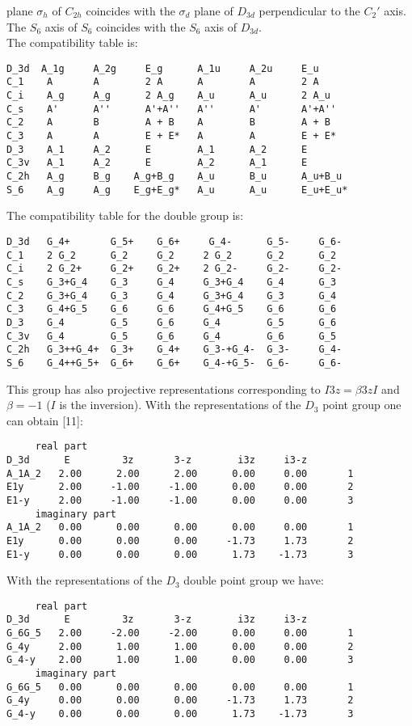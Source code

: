 \documentclass[12pt,a4paper]{article}
\begin{document}
plane $\sigma_h$ of $C_{2h}$ coincides with the $\sigma_d$ plane of $D_{3d}$
perpendicular to the $C_2'$ axis. The $S_6$ axis of $S_6$ coincides with the
$S_6$ axis of $D_{3d}$. \\
The compatibility table is:
\begin{verbatim}
D_3d  A_1g     A_2g     E_g      A_1u     A_2u     E_u
C_1    A       A        2 A      A        A        2 A
C_i    A_g     A_g      2 A_g    A_u      A_u      2 A_u
C_s    A'      A''      A'+A''   A''      A'       A'+A''
C_2    A       B        A + B    A        B        A + B
C_3    A       A        E + E*   A        A        E + E*
D_3    A_1     A_2      E        A_1      A_2      E
C_3v   A_1     A_2      E        A_2      A_1      E
C_2h   A_g     B_g    A_g+B_g    A_u      B_u      A_u+B_u   
S_6    A_g     A_g    E_g+E_g*   A_u      A_u      E_u+E_u*
\end{verbatim}
The compatibility table for the double group is:
\begin{verbatim}
D_3d   G_4+       G_5+    G_6+     G_4-      G_5-     G_6-
C_1    2 G_2      G_2     G_2     2 G_2      G_2      G_2      
C_i    2 G_2+     G_2+    G_2+    2 G_2-     G_2-     G_2-
C_s    G_3+G_4    G_3     G_4     G_3+G_4    G_4      G_3
C_2    G_3+G_4    G_3     G_4     G_3+G_4    G_3      G_4    
C_3    G_4+G_5    G_6     G_6     G_4+G_5    G_6      G_6
D_3    G_4        G_5     G_6     G_4        G_5      G_6
C_3v   G_4        G_5     G_6     G_4        G_6      G_5
C_2h   G_3++G_4+  G_3+    G_4+    G_3-+G_4-  G_3-     G_4-
S_6    G_4++G_5+  G_6+    G_6+    G_4-+G_5-  G_6-     G_6-
\end{verbatim}
This group has also projective representations corresponding to
$I {3z} = \beta {3z} I$ and $\beta=-1$ ($I$ is the inversion).
With the representations of the $D_3$ point group one can obtain [11]:
\begin{verbatim}
     real part
D_3d      E         3z       3-z        i3z     i3-z
A_1A_2   2.00      2.00      2.00      0.00     0.00       1
E1y      2.00     -1.00     -1.00      0.00     0.00       2
E1-y     2.00     -1.00     -1.00      0.00     0.00       3
     imaginary part
A_1A_2   0.00      0.00      0.00      0.00     0.00       1
E1y      0.00      0.00      0.00     -1.73     1.73       2
E1-y     0.00      0.00      0.00      1.73    -1.73       3
\end{verbatim}
With the representations of the $D_3$ double point group we have:
\begin{verbatim}
     real part
D_3d      E         3z       3-z        i3z     i3-z
G_6G_5   2.00     -2.00     -2.00      0.00     0.00       1
G_4y     2.00      1.00      1.00      0.00     0.00       2
G_4-y    2.00      1.00      1.00      0.00     0.00       3
     imaginary part
G_6G_5   0.00      0.00      0.00      0.00     0.00       1
G_4y     0.00      0.00      0.00     -1.73     1.73       2
G_4-y    0.00      0.00      0.00      1.73    -1.73       3
\end{verbatim}
\end{document}
